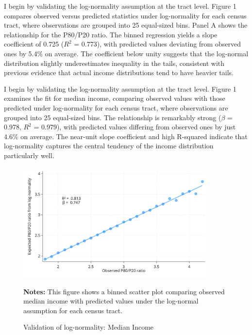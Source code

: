 I begin by validating the log-normality assumption at the tract level. Figure 1 compares observed versus predicted statistics under log-normality for each census tract, where observations are grouped into 25 equal-sized bins. Panel A shows the relationship for the P80/P20 ratio. The binned regression yields a slope coefficient of 0.725 ($R^2$ = 0.773), with predicted values deviating from observed ones by 5.4\% on average. The coefficient below unity suggests that the log-normal distribution slightly underestimates inequality in the tails, consistent with previous evidence that actual income distributions tend to have heavier tails.

I begin by validating the log-normality assumption at the tract level. Figure 1 examines the fit for median income, comparing observed values with those predicted under log-normality for each census tract, where observations are grouped into 25 equal-sized bins. The relationship is remarkably strong ($\beta$ = 0.978, $R^2$ = 0.979), with predicted values differing from observed ones by just 4.6\% on average. The near-unit slope coefficient and high R-squared indicate that log-normality captures the central tendency of the income distribution particularly well.

\begin{figure}[H]
\begin{center}
\captionsetup{justification=centering}
\caption{Validation of log-normality: Median Income}
\label{fig:median}
\includegraphics[width=0.9\textwidth]{output/binned_scatter_median.png}
\end{center}
\begin{fignotes}
\textbf{Notes:} This figure shows a binned scatter plot comparing observed median income with predicted values under the log-normal assumption for each census tract. 
\end{fignotes}
\end{figure}

